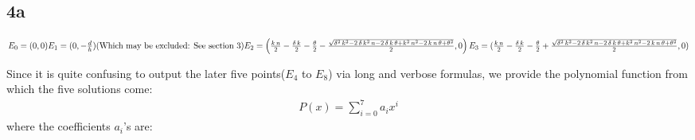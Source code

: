 \documentclass{article}
\begin{document}
\subsection{4a}
\noindent
$
        E_{0}=(0,0)\\
        \\
        E_{1}=(0,-\frac{d}{h}) \text{(Which may be excluded: See section 3)}\\
        \\
        E_{2}=\left(\frac{k\,n}{2}-\frac{\delta \,k}{2}-\frac{\theta }{2}-\frac{\sqrt{\delta ^2\,k^2-2\,\delta \,k^2\,n-2\,\delta \,k\,\theta +k^2\,n^2-2\,k\,n\,\theta +\theta ^2}}{2},0\right)\\
        \\
        E_{3}=(\frac{k\,n}{2}-\frac{\delta \,k}{2}-\frac{\theta }{2}+\frac{\sqrt{\delta ^2\,k^2-2\,\delta \,k^2\,n-2\,\delta \,k\,\theta +k^2\,n^2-2\,k\,n\,\theta +\theta ^2}}{2},0)\\
$
\par Since it is quite confusing to output the later five points($E_{4}$ to $E_{8}$) via long and verbose formulas, we provide the polynomial function from which the five solutions come:
\begin{align*}
    P(x)=\sum_{i=0}^{7}a_{i}x^{i}
\end{align*}
where the coefficients $a_{i}$'s are:
\end{document}
